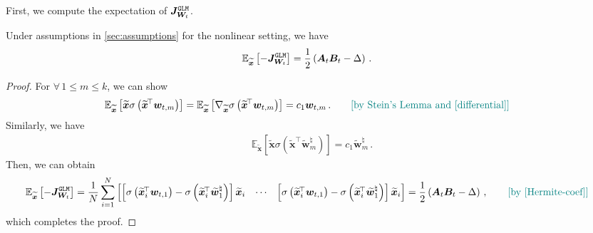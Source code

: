 First, we compute the expectation of $\bm J_{\bm W_t}^{\tt GLM}$.
\begin{lemma}
\label{expec-smooth-grad}
    Under assumptions in \cref{sec:assumptions} for the nonlinear setting, we have
    \begin{align*}
        \mathbb{E}_{\widetilde{\bm x}}\left[-\bm J_{\bm W_t}^{\tt GLM}\right] & = \frac{1}{2} \left(\bm A_t \bm B_t - \Delta\right)\,.
    \end{align*}
\end{lemma}
\begin{proof}
For $\forall\,1\leq m \leq k$, we can show
\begin{align*}
    & \mathbb{E}_{\widetilde{\bm x}}\left[\widetilde{\bm x}\sigma \left(\widetilde{\bm x}^{\!\top}\bm w_{t,m}\right)\right]
    = \mathbb{E}_{\widetilde{\bm x}}\left[\nabla_{\widetilde{\bm x}}\sigma \left(\widetilde{\bm x}^{\!\top}\bm w_{t,m}\right)\right]
    = c_1 \bm w_{t,m}\,.\tag*{\color{teal}[by Stein's Lemma and \cref{differential}]}
\end{align*}
Similarly, we have
\begin{align*}
    \mathbb{E}_{\widetilde{\bm x}}\left[\widetilde{\bm x}\sigma \left(\widetilde{\bm x}^{\!\top}\widetilde{\bm w}_m^\natural\right)\right]= c_1 \widetilde{\bm w}_m^\natural\,.
\end{align*}
Then, we can obtain
\begin{align*}
    \mathbb{E}_{\widetilde{\bm x}}\left[-\bm J_{\bm W_t}^{\tt GLM}\right] & = \frac{1}{N}\sum_{i=1}^N \begin{bmatrix}\left[\sigma \left(\widetilde{\bm x}_i^{\!\top}\bm w_{t,1}\right)-\sigma \left(\widetilde{\bm x}_i^{\!\top}\widetilde{\bm w}_1^\natural\right)\right] \widetilde{\bm x}_i & \cdots & \left[\sigma \left(\widetilde{\bm x}_i^{\!\top}\bm w_{t,1}\right)-\sigma \left(\widetilde{\bm x}_i^{\!\top}\widetilde{\bm w}_1^\natural\right)\right] \widetilde{\bm x}_i
    \end{bmatrix}
     = \frac{1}{2} \left(\bm A_t \bm B_t - \Delta\right)\,,\tag*{\color{teal}[by \cref{Hermite-coef}]}
\end{align*}
which completes the proof.
\end{proof}

